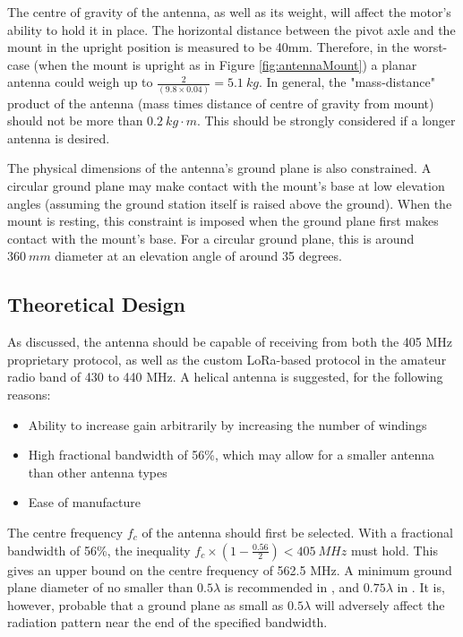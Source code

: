 The centre of gravity of the antenna, as well as its weight, will affect the motor's ability to hold it in place. The horizontal distance between the pivot axle and the mount in the upright position is measured to be 40mm. Therefore, in the worst-case (when the mount is upright as in Figure \ref{fig:antennaMount}) a planar antenna could weigh up to $\frac{2}{(9.8 \times 0.04)} = \SI{5.1}{kg}$. In general, the "mass-distance" product of the antenna (mass times distance of centre of gravity from mount) should not be more than $\SI{0.2}{kg \cdot m}$. This should be strongly considered if a longer antenna is desired.

The physical dimensions of the antenna's ground plane is also constrained. A circular ground plane may make contact with the mount's base at low elevation angles (assuming the ground station itself is raised above the ground). When the mount is resting, this constraint is imposed when the ground plane first makes contact with the mount's base. For a circular ground plane, this is around $\SI{360}{mm}$ diameter at an elevation angle of around 35 degrees.

\subsection{Theoretical Design}
As discussed, the antenna should be capable of receiving from both the 405 MHz proprietary protocol, as well as the custom LoRa-based protocol in the amateur radio band of 430 to 440 MHz. A helical antenna is suggested, for the following reasons:
\begin{itemize}
    \item Ability to increase gain arbitrarily by increasing the number of windings
    \item High fractional bandwidth of 56\%, which may allow for a smaller antenna than other antenna types
    \item Ease of manufacture
\end{itemize}

The centre frequency $f_c$ of the antenna should first be selected. With a fractional bandwidth of 56\%, the inequality $f_c \times (1 - \frac{0.56}{2}) < \SI{405}{MHz}$ must hold. This gives an upper bound on the centre frequency of 562.5 MHz. A minimum ground plane diameter of no smaller than $0.5 \lambda$ is recommended in \cite{textbook-antennaTheoryAnalysisDesign}, and $0.75 \lambda$ in \cite{textbook-helicalAntenna}. It is, however, probable that a ground plane as small as $0.5 \lambda$ will adversely affect the radiation pattern near the end of the specified bandwidth.

